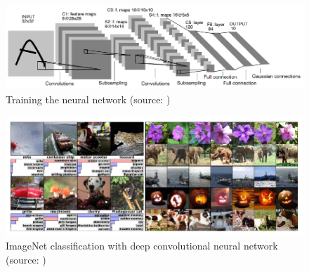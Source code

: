   \begin{figure}[h]
    \centering
    \includegraphics[keepaspectratio, scale=0.80] {images/pdf/yann_CNN}
    \caption[Training the neural network]{Training the neural network (source: \cite{yann1})}
    \label{Fig:yann_CNN}
  \end{figure}

\newpage

  \begin{figure}[h]
    \centering
    \includegraphics[keepaspectratio, scale=0.80] {images/pdf/deep_convolutional_neural_networks}
    \caption[ImageNet classification with deep convolutional neural network]{ImageNet classification with deep convolutional neural network (source: \cite{alex})}
    \label{Fig:deep_convolutional_neural_networks}
  \end{figure}


\newpage


